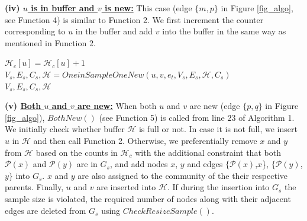 \noindent\textbf{(iv) \underline{$u$ is in buffer and $v$ is new:}} This case (edge $\{m,p\}$ in Figure \ref{fig_algo}, see Function 4) is similar to Function 2. We first increment the counter corresponding to $u$ in the buffer and add $v$ into the buffer in the same way as mentioned in Function 2.
\begin{function4}[!h]
\caption{\small$OneinBufferOneNew(u,v,e_t,V_s,E_s,\mathcal{H},C_s)$}
$\mathcal{H}_c[u]=\mathcal{H}_c[u]+1$\\
$V_s,E_s,C_s,\mathcal{H} = OneinSampleOneNew(u,v,e_t,V_s,E_s,\mathcal{H},C_s)$\\
\Return $V_s,E_s,C_s,\mathcal{H}$  %
\end{function4}

\noindent\textbf{(v) \underline{Both $u$ and $v$ are new:}}
When both $u$ and $v$ are new (edge $\{p,q\}$ in Figure \ref{fig_algo}), $BothNew()$ (see Function 5) is called from line 23 of Algorithm 1. We initially check whether buffer $\mathcal{H}$ is full or not. In case it is not full, we insert $u$ in $\mathcal{H}$ and then call Function 2. Otherwise, we preferentially remove $x$ and $y$ from $\mathcal{H}$ based on the counts in $\mathcal{H}_c$ with the additional constraint that both $\mathcal{P}(x)$ and $\mathcal{P}(y)$ are in $G_s$, and add nodes $x$, $y$ and edges $\{\mathcal{P}(x)$,$x$\}, $\{\mathcal{P}(y)$,$y\}$ into $G_s$. $x$ and $y$ are also assigned to the community of the their respective parents. Finally, $u$ and $v$ are inserted into $\mathcal{H}$. If during the insertion into $G_s$ the sample size is violated, the required number of nodes along with their adjacent edges are deleted from $G_s$ using $CheckResizeSample()$.



